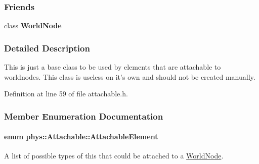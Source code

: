 \subsubsection*{Friends}
\begin{DoxyCompactItemize}
\item 
\hypertarget{classphys_1_1Attachable_a1cacd07efb11226da49a7c80569b18e8}{
class {\bfseries WorldNode}}
\label{df/dbd/classphys_1_1Attachable_a1cacd07efb11226da49a7c80569b18e8}

\end{DoxyCompactItemize}


\subsubsection{Detailed Description}
This is just a base class to be used by elements that are attachable to worldnodes. This class is useless on it's own and should not be created manually. 

Definition at line 59 of file attachable.h.



\subsubsection{Member Enumeration Documentation}
\hypertarget{classphys_1_1Attachable_acd1fca033e7cc0bb3024a92d466d213a}{
\paragraph[{AttachableElement}]{\setlength{\rightskip}{0pt plus 5cm}enum {\bf phys::Attachable::AttachableElement}}\hfill}
\label{df/dbd/classphys_1_1Attachable_acd1fca033e7cc0bb3024a92d466d213a}


A list of possible types of this that could be attached to a \hyperlink{classphys_1_1WorldNode}{WorldNode}. 

